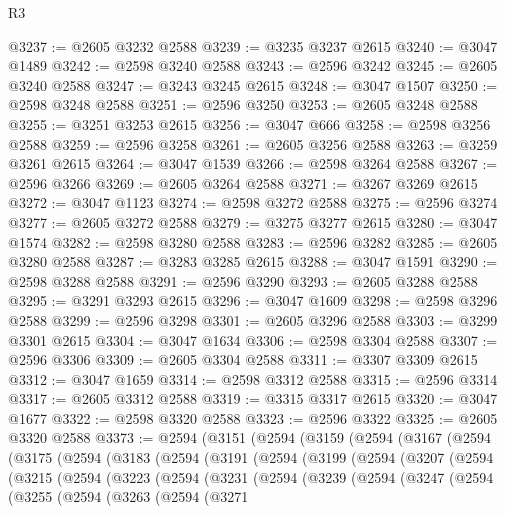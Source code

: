 \begin{lexlean}{R3}
\begin{coremodule}
@3237 := @2605 @3232 @2588
@3239 := @3235 @3237 @2615
@3240 := @3047 @1489
@3242 := @2598 @3240 @2588
@3243 := @2596 @3242
@3245 := @2605 @3240 @2588
@3247 := @3243 @3245 @2615
@3248 := @3047 @1507
@3250 := @2598 @3248 @2588
@3251 := @2596 @3250
@3253 := @2605 @3248 @2588
@3255 := @3251 @3253 @2615
@3256 := @3047 @666
@3258 := @2598 @3256 @2588
@3259 := @2596 @3258
@3261 := @2605 @3256 @2588
@3263 := @3259 @3261 @2615
@3264 := @3047 @1539
@3266 := @2598 @3264 @2588
@3267 := @2596 @3266
@3269 := @2605 @3264 @2588
@3271 := @3267 @3269 @2615
@3272 := @3047 @1123
@3274 := @2598 @3272 @2588
@3275 := @2596 @3274
@3277 := @2605 @3272 @2588
@3279 := @3275 @3277 @2615
@3280 := @3047 @1574
@3282 := @2598 @3280 @2588
@3283 := @2596 @3282
@3285 := @2605 @3280 @2588
@3287 := @3283 @3285 @2615
@3288 := @3047 @1591
@3290 := @2598 @3288 @2588
@3291 := @2596 @3290
@3293 := @2605 @3288 @2588
@3295 := @3291 @3293 @2615
@3296 := @3047 @1609
@3298 := @2598 @3296 @2588
@3299 := @2596 @3298
@3301 := @2605 @3296 @2588
@3303 := @3299 @3301 @2615
@3304 := @3047 @1634
@3306 := @2598 @3304 @2588
@3307 := @2596 @3306
@3309 := @2605 @3304 @2588
@3311 := @3307 @3309 @2615
@3312 := @3047 @1659
@3314 := @2598 @3312 @2588
@3315 := @2596 @3314
@3317 := @2605 @3312 @2588
@3319 := @3315 @3317 @2615
@3320 := @3047 @1677
@3322 := @2598 @3320 @2588
@3323 := @2596 @3322
@3325 := @2605 @3320 @2588
@3373 := @2594
    (@3151
      (@2594
        (@3159
          (@2594
            (@3167
              (@2594
                (@3175
                  (@2594
                    (@3183
                      (@2594
                        (@3191
                          (@2594
                            (@3199
                              (@2594
                                (@3207
                                  (@2594
                                    (@3215
                                      (@2594
                                        (@3223
                                          (@2594
                                            (@3231
                                              (@2594
                                                (@3239
                                                  (@2594
                                                    (@3247
                                                      (@2594
                                                        (@3255
                                                          (@2594
                                                            (@3263
                                                              (@2594
                                                                (@3271

\end{coremodule}
\end{lexlean}
